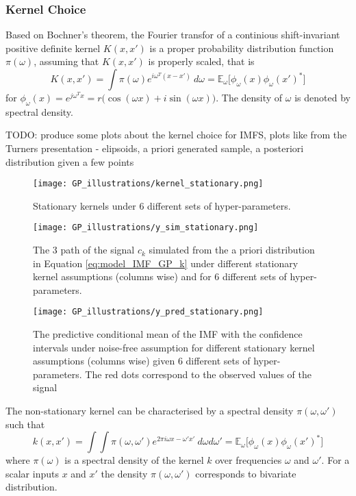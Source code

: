\subsubsection{Kernel Choice}
Based on Bochner's theorem, the Fourier transfor of a continious shift-invariant positive definite kernel $K(x,x')$ is a proper probability distribution function $\pi(\omega)$, assuming that $K(x,x')$ is properly scaled, that is
\begin{equation}
K(x,x') = \int \pi(\omega) e^{ i \omega^T (x - x') }\ d\omega = \mathbb{E}_{\omega}\big[ \phi_\omega (x) \phi_\omega (x')^* \big] 
\end{equation}
for $\phi_\omega (x)  =e^{j \omega^T x} = r \big( \cos (\omega x ) + i \sin (\omega x )\big)$. The density of $\omega$ is denoted by spectral density. 


TODO: produce some plots about the kernel choice for IMFS, plots like from the Turners presentation - elipsoids, a priori generated sample, a posteriori distribution given a few points


\begin{figure}[H]
\centering
\texttt{[image: GP\_illustrations/kernel\_stationary.png]}
\caption{Stationary kernels under 6 different sets of hyper-parameters.}\label{fig:}
\end{figure}

\begin{figure}[H]
\centering
\texttt{[image: GP\_illustrations/y\_sim\_stationary.png]}
\caption{The 3 path of the signal $c_k$ simulated from the a priori distribution in Equation \eqref{eq:model_IMF_GP_k} under different stationary kernel assumptions (columns wise) and for 6 different sets of hyper-parameters.}\label{fig:}
\end{figure}

\begin{figure}[H]
\centering
\texttt{[image: GP\_illustrations/y\_pred\_stationary.png]}
\caption{The predictive conditional mean of the IMF with the confidence intervals  under  noise-free assumption for different stationary kernel assumptions (columns wise) given 6 different sets of hyper-parameters. The red dots correspond to the observed values of the signal}\label{fig:}
\end{figure}



The non-stationary kernel can be characterised by a spectral density $\pi(\omega,\omega')$ such that
\begin{equation}
k(x,x') =\int \int \pi(\omega,\omega') e^{ 2 \pi i \omega x - \omega' x' }\ d\omega d\omega' = \mathbb{E}_{\omega}\big[ \phi_\omega (x) \phi_\omega (x')^* \big] 
\end{equation}
where $\pi(\omega)$ is a spectral density of the kernel $k$ over frequencies $\omega$ and $\omega'$. For a scalar inputs $x$ and $x'$ the density $\pi(\omega,\omega')$ corresponds to bivariate distribution. 